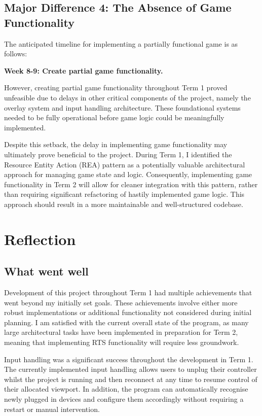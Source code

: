 \documentclass{article}
\begin{document}
\subsection{Major Difference 4: The Absence of Game Functionality}
The anticipated timeline for implementing a partially functional game is as follows:

\textbf{Week 8-9: Create partial game functionality.}

However, creating partial game functionality throughout Term 1 proved unfeasible due to delays in other critical components of the project, namely the overlay system and input handling architecture. These foundational systems needed to be fully operational before game logic could be meaningfully implemented.

Despite this setback, the delay in implementing game functionality may ultimately prove beneficial to the project. During Term 1, I identified the Resource Entity Action (REA) pattern as a potentially valuable architectural approach for managing game state and logic. Consequently, implementing game functionality in Term 2 will allow for cleaner integration with this pattern, rather than requiring significant refactoring of hastily implemented game logic. This approach should result in a more maintainable and well-structured codebase.
\newpage
\section{Reflection}
\subsection{What went well}
Development of this project throughout Term 1 had multiple achievements that went beyond my initially set goals. These achievements involve either more robust implementations or additional functionality not considered during initial planning. I am satisfied with the current overall state of the program, as many large architectural tasks have been implemented in preparation for Term 2, meaning that implementing RTS functionality will require less groundwork. \newline

Input handling was a significant success throughout the development in Term 1. The currently implemented input handling allows users to unplug their controller whilst the project is running and then reconnect at any time to resume control of their allocated viewport. In addition, the program can automatically recognise newly plugged in devices and configure them accordingly without requiring a restart or manual intervention. \newline
\end{document}
